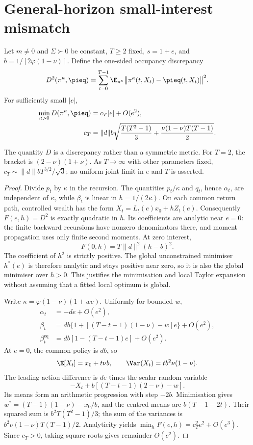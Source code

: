 \ifdim\dimexpr\pagegoal-\pagetotal\relax<120pt\newpage\fi
\section{General-horizon small-interest mismatch}
\label{app:horizon}
\begin{theorem}
Let $m\ne0$ and $\Sigma\succ0$ be constant, $T\ge2$ fixed, $s=1+e$, and
$b=1/[2\varphi(1-\nu)]$. Define the one-sided occupancy discrepancy
\[
 D^2(\pi^\kappa,\pieq)
 =\sum_{t=0}^{T-1}\E_{\pi^\kappa}
   \bigl\|\pi^\kappa(t,X_t)-\pieq(t,X_t)\bigr\|^2.
\]
For sufficiently small $|e|$,
\begin{align}
 \min_{\kappa>0}D(\pi^\kappa,\pieq)&=c_T|e|+O(e^2),\\
 c_T&=\|d\|b\sqrt{\frac{T(T^2-1)}{3}
            +\frac{\nu(1-\nu)T(T-1)}{2}}.
\end{align}
\end{theorem}
The quantity $D$ is a discrepancy rather than a symmetric metric. For $T=2$,
the bracket is $(2-\nu)(1+\nu)$. As $T\to\infty$ with other parameters fixed,
$c_T\sim\|d\|bT^{3/2}/\sqrt{3}$; no uniform joint limit in $e$ and $T$ is asserted.

\begin{proof}
Divide $p_t$ by $\kappa$ in the recursion. The quantities $p_t/\kappa$ and
$q_t$, hence $\alpha_t$, are independent of $\kappa$, while $\beta_t$ is linear
in $h=1/(2\kappa)$. On each common return path, controlled wealth has the form
$X_t=L_t(e)x_0+hZ_t(e)$. Consequently $F(e,h)=D^2$ is exactly quadratic in $h$.
Its coefficients are analytic near $e=0$: the finite backward recursions have
nonzero denominators there, and moment propagation uses only finite second moments.
At zero interest,
\[
 F(0,h)=T\|d\|^2(h-b)^2.
\]
The coefficient of $h^2$ is strictly positive. The global unconstrained minimiser
$h^*(e)$ is therefore analytic and stays positive near zero, so it is also the
global minimiser over $h>0$. This justifies the minimisation and local Taylor
expansion without assuming that a fitted local optimum is global.

Write $\kappa=\varphi(1-\nu)(1+we)$. Uniformly for bounded $w$,
\begin{align*}
 \alpha_t&=-de+O(e^2),\\
 \beta_t&=db\{1+[(T-t-1)(1-\nu)-w]e\}+O(e^2),\\
 \beta_t^{\mathrm{eq}}&=db[1-(T-t-1)e]+O(e^2).
\end{align*}
At $e=0$, the common policy is $db$, so
\[
 \E[X_t]=x_0+t\nu b,\qquad
 \Var(X_t)=tb^2\nu(1-\nu).
\]
The leading action difference is $de$ times the scalar random variable
\[
 -X_t+b[(T-t-1)(2-\nu)-w].
\]
Its means form an arithmetic progression with step $-2b$. Minimisation gives
$w^*=(T-1)(1-\nu)-x_0/b$, and the centred means are $b(T-1-2t)$.
Their squared sum is $b^2T(T^2-1)/3$; the sum of the variances is
$b^2\nu(1-\nu)T(T-1)/2$. Analyticity yields
$\min_hF(e,h)=c_T^2e^2+O(e^3)$. Since $c_T>0$, taking square roots gives
remainder $O(e^2)$.
\end{proof}

